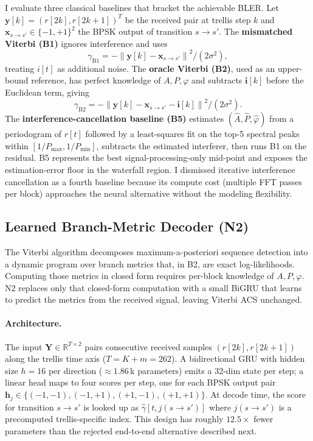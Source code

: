 \documentclass[conference]{IEEEtran}
\newcommand{\norm}[1]{\left\lVert#1\right\rVert}
\begin{document}
I evaluate three classical baselines that bracket the achievable BLER.
Let $\mathbf{y}[k]=(r[2k], r[2k{+}1])^T$ be the received pair at trellis
step $k$ and $\mathbf{x}_{s\to s'}\in\{-1,+1\}^2$ the BPSK output of
transition $s\to s'$.  The \textbf{mismatched Viterbi (B1)} ignores
interference and uses
\begin{equation}
  \gamma_{\mathrm{B1}} = -\norm{\mathbf{y}[k]-\mathbf{x}_{s\to s'}}^2/(2\sigma^2),
  \label{eq:b1}
\end{equation}
treating $i[t]$ as additional noise.  The \textbf{oracle Viterbi (B2)},
used as an upper-bound reference, has perfect knowledge of $A,P,\varphi$
and subtracts $\mathbf{i}[k]$ before the Euclidean term, giving
\begin{equation}
  \gamma_{\mathrm{B2}} = -\norm{\mathbf{y}[k]-\mathbf{x}_{s\to s'}-\mathbf{i}[k]}^2/(2\sigma^2).
  \label{eq:b2}
\end{equation}
The \textbf{interference-cancellation baseline (B5)} estimates
$(\hat A,\hat P,\hat\varphi)$ from a periodogram of $r[t]$ followed by a
least-squares fit on the top-5 spectral peaks within
$[1/P_{\max},1/P_{\min}]$, subtracts the estimated interferer, then runs
B1 on the residual.  B5 represents the best signal-processing-only
mid-point and exposes the estimation-error floor in the waterfall region.
I dismissed iterative interference cancellation as a fourth baseline
because its compute cost (multiple FFT passes per block) approaches the
neural alternative without the modeling flexibility.

\subsection{Learned Branch-Metric Decoder (N2)}
\label{sec:n2}

The Viterbi algorithm decomposes maximum-a-posteriori sequence detection
into a dynamic program over branch metrics that, in B2, are exact
log-likelihoods.  Computing those metrics in closed form requires per-block
knowledge of $A,P,\varphi$.  N2 replaces only that closed-form
computation with a small BiGRU that learns to predict the metrics from
the received signal, leaving Viterbi ACS unchanged.

\paragraph*{Architecture.}
The input $\mathbf{Y}\in\mathbb{R}^{T\times 2}$ pairs consecutive received
samples $(r[2k],r[2k{+}1])$ along the trellis time axis ($T=K{+}m=262$).
A bidirectional GRU with hidden size $h=16$ per direction
($\approx 1.86$\,k parameters) emits a 32-dim state per step; a linear
head maps to four scores per step, one for each BPSK output pair
$\mathbf{h}_j\in\{(-1,-1),(-1,+1),(+1,-1),(+1,+1)\}$.  At decode time,
the score for transition $s\to s'$ is looked up as
$\hat\gamma[t,j(s\to s')]$ where $j(s\to s')$ is a precomputed
trellis-specific index.  This design has roughly $12.5\times$ fewer
parameters than the rejected end-to-end alternative described next.
\end{document}
